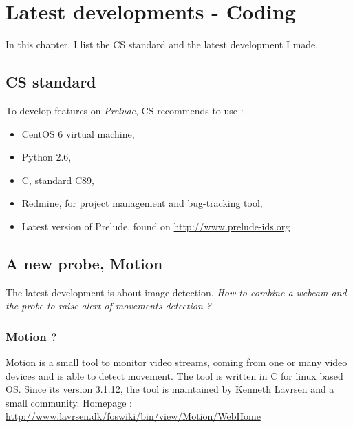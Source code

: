 \documentclass{koala-en}
\begin{document}
\thispagestyle{fancy}
\newpage

\chapter{Latest developments - Coding}
In this chapter, I list the CS standard and the latest development I made.

\section{CS standard}
To develop features on \emph{Prelude}, CS recommends to use :
\begin{itemize}
  \item CentOS 6 virtual machine,
  \item Python 2.6,
  \item C, standard C89,
  \item Redmine, for project management and bug-tracking tool,
  \item Latest version of Prelude, found on \url{http://www.prelude-ids.org}
\end{itemize}

\section{A new probe, Motion}
The latest development is about image detection. \emph{How to combine a webcam and the probe to raise alert of movements detection ?}

\subsection{Motion ?}
Motion is a small tool to monitor video streams, coming from one or many video devices and is able to detect movement.
\newline
\newline
The tool is written in C for linux based OS.
\newline
\newline
Since its version 3.1.12, the tool is maintained by Kenneth Lavrsen and a small community.
\newline
Homepage : \url{http://www.lavrsen.dk/foswiki/bin/view/Motion/WebHome}
\end{document}
